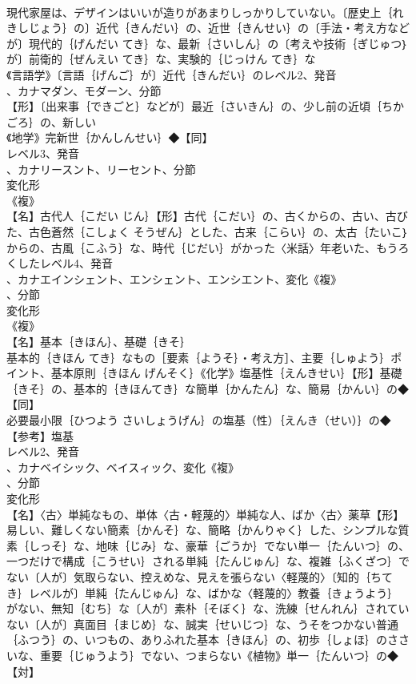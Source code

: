 \documentclass[8pt]{extreport}
\begin{document}
\begin{CJK}{UTF8}{min}
\\	現代家屋は、デザインはいいが造りがあまりしっかりしていない。〔歴史上｛れきしじょう｝の〕近代｛きんだい｝の、近世｛きんせい｝の〔手法・考え方などが〕現代的｛げんだい てき｝な、最新｛さいしん｝の〔考えや技術｛ぎじゅつ｝が〕前衛的｛ぜんえい てき｝な、実験的｛じっけん てき｝な
\\	《言語学》〔言語｛げんご｝が〕近代｛きんだい｝のレベル2、発音
\\	、カナマダン、モダーン、分節
\\	【形】〔出来事｛できごと｝などが〕最近｛さいきん｝の、少し前の近頃｛ちかごろ｝の、新しい
\\	《地学》完新世｛かんしんせい｝◆【同】
\\	レベル3、発音
\\	、カナリースント、リーセント、分節
\\	変化形 
\\	《複》
\\	【名】古代人｛こだい じん｝【形】古代｛こだい｝の、古くからの、古い、古びた、古色蒼然｛こしょく そうぜん｝とした、古来｛こらい｝の、太古｛たいこ｝からの、古風｛こふう｝な、時代｛じだい｝がかった〈米話〉年老いた、もうろくしたレベル4、発音
\\	、カナエインシェント、エンシェント、エンシエント、変化《複》
\\	、分節
\\	変化形 
\\	《複》
\\	【名】基本｛きほん｝、基礎｛きそ｝
\\	基本的｛きほん てき｝なもの［要素｛ようそ｝・考え方］、主要｛しゅよう｝ポイント、基本原則｛きほん げんそく｝《化学》塩基性｛えんきせい｝【形】基礎｛きそ｝の、基本的｛きほんてき｝な簡単｛かんたん｝な、簡易｛かんい｝の◆【同】
\\	必要最小限｛ひつよう さいしょうげん｝の塩基（性）｛えんき（せい）｝の◆【参考】塩基
\\	レベル2、発音
\\	、カナベイシック、ベイスィック、変化《複》
\\	、分節
\\	変化形 
\\	【名】〈古〉単純なもの、単体〈古・軽蔑的〉単純な人、ばか〈古〉薬草【形】易しい、難しくない簡素｛かんそ｝な、簡略｛かんりゃく｝した、シンプルな質素｛しっそ｝な、地味｛じみ｝な、豪華｛ごうか｝でない単一｛たんいつ｝の、一つだけで構成｛こうせい｝される単純｛たんじゅん｝な、複雑｛ふくざつ｝でない〔人が〕気取らない、控えめな、見えを張らない〈軽蔑的〉〔知的｛ちてき｝レベルが〕単純｛たんじゅん｝な、ばかな〈軽蔑的〉教養｛きょうよう｝がない、無知｛むち｝な〔人が〕素朴｛そぼく｝な、洗練｛せんれん｝されていない〔人が〕真面目｛まじめ｝な、誠実｛せいじつ｝な、うそをつかない普通｛ふつう｝の、いつもの、ありふれた基本｛きほん｝の、初歩｛しょほ｝のささいな、重要｛じゅうよう｝でない、つまらない《植物》単一｛たんいつ｝の◆【対】

\end{CJK}
\end{document}
